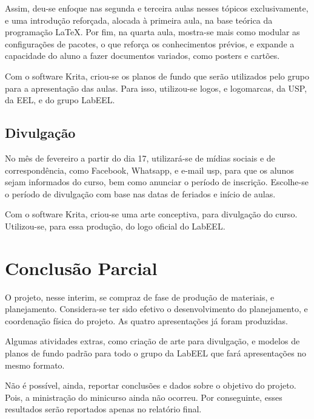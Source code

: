 \documentclass[
	12pt,				%
	openright,			%
	oneside,			%
	a4paper,			%
	english,			%
	french,				%
	spanish,			%
	brazil,				%
	]{abntex2}
\begin{document}
Assim, deu-se enfoque nas segunda e terceira aulas nesses
tópicos exclusivamente, e uma introdução reforçada, alocada à primeira
aula,  na base teórica da programação \LaTeX. Por fim, na quarta aula,
mostra-se mais como modular as configurações de pacotes, o que reforça
os conhecimentos prévios, e expande a capacidade do aluno a fazer
documentos variados, como posters e cartões.

Com o software Krita, criou-se os planos de fundo que serão utilizados
pelo grupo para a apresentação das aulas. Para isso, utilizou-se logos, e
logomarcas, da USP, da EEL, e do grupo LabEEL.

\section{Divulgação}

No mês de fevereiro a partir do dia 17, utilizará-se de mídias sociais e de correspondência, como Facebook,
Whatsapp, e e-mail usp, para que os alunos sejam informados do curso,
bem como anunciar o período de inscrição. Escolhe-se o período de
divulgação com base nas datas de feriados e início de aulas.

Com o software Krita, criou-se uma arte conceptiva, para divulgação do
curso. Utilizou-se, para essa produção, do logo oficial do LabEEL.


\chapter{Conclusão Parcial}

O projeto, nesse interim, se compraz de fase de produção de materiais,
e planejamento. Considera-se ter sido efetivo o desenvolvimento do
planejamento, e coordenação física do projeto. As quatro apresentações já
foram produzidas.

Algumas atividades extras, como criação de arte para divulgação, e
modelos de planos de fundo padrão para todo o grupo da LabEEL que fará
apresentações no mesmo formato.

Não é possível, ainda, reportar conclusões e dados sobre o objetivo do
projeto. Pois, a ministração do minicurso ainda não ocorreu. Por conseguinte,
esses resultados serão reportados apenas no relatório final.



\end{document}
